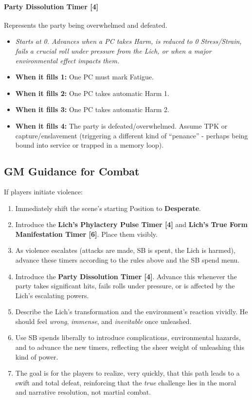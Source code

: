 \documentclass[18pt, letterpaper, twoside]{article}
\begin{document}
\paragraph{Party Dissolution Timer [4]}
Represents the party being overwhelmed and defeated.
\begin{itemize}
    \item \emph{Starts at 0. Advances when a PC takes Harm, is reduced to 0 Stress/Strain, fails a crucial roll under pressure from the Lich, or when a major environmental effect impacts them.}
    \item \textbf{When it fills 1:} One PC must mark Fatigue.
    \item \textbf{When it fills 2:} One PC takes automatic Harm 1.
    \item \textbf{When it fills 3:} One PC takes automatic Harm 2.
    \item \textbf{When it fills 4:} The party is defeated/overwhelmed. Assume TPK or capture/enslavement (triggering a different kind of ``penance'' - perhaps being bound into service or trapped in a memory loop).
\end{itemize}

\subsection*{GM Guidance for Combat}
If players initiate violence:
\begin{enumerate}
    \item Immediately shift the scene's starting Position to \textbf{Desperate}.
    \item Introduce the \textbf{Lich's Phylactery Pulse Timer [4]} and \textbf{Lich's True Form Manifestation Timer [6]}. Place them visibly.
    \item As violence escalates (attacks are made, SB is spent, the Lich is harmed), advance these timers according to the rules above and the SB spend menu.
    \item Introduce the \textbf{Party Dissolution Timer [4]}. Advance this whenever the party takes significant hits, fails rolls under pressure, or is affected by the Lich's escalating powers.
    \item Describe the Lich's transformation and the environment's reaction vividly. He should feel \emph{wrong}, \emph{immense}, and \emph{inevitable} once unleashed.
    \item Use SB spends liberally to introduce complications, environmental hazards, and to advance the new timers, reflecting the sheer weight of unleashing this kind of power.
    \item The goal is for the players to realize, very quickly, that this path leads to a swift and total defeat, reinforcing that the \emph{true} challenge lies in the moral and narrative resolution, not martial combat.
\end{enumerate}
\end{document}
